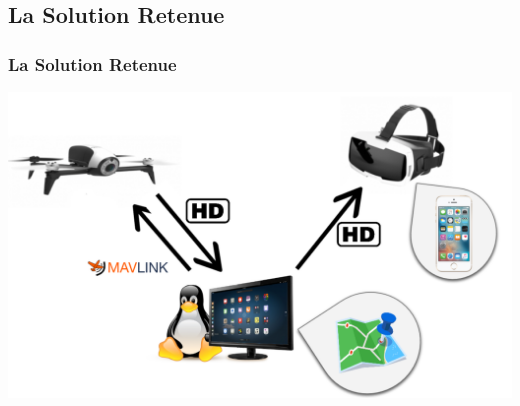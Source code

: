 \documentclass{beamer}
\begin{document}
	\begin{frame}
	\section{La Solution Retenue}
		\begin{center}
		\frametitle{La Solution Retenue}
            \includegraphics[scale=0.45]{schemaPC.png}
		\end{center}
	\end{frame}
	
\end{document}
